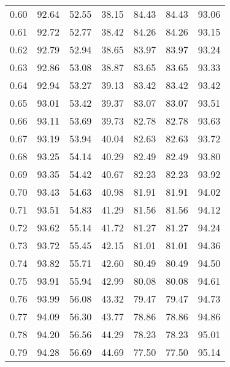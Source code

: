 \begin{tabular}{|c|c|c|c|c|c|c|}
      0.60 &     92.64 &     52.55 &      38.15 &   84.43 &      84.43 &         93.06 \\
      0.61 &     92.72 &     52.77 &      38.42 &   84.26 &      84.26 &         93.15 \\
      0.62 &     92.79 &     52.94 &      38.65 &   83.97 &      83.97 &         93.24 \\
      0.63 &     92.86 &     53.08 &      38.87 &   83.65 &      83.65 &         93.33 \\
      0.64 &     92.94 &     53.27 &      39.13 &   83.42 &      83.42 &         93.42 \\
      0.65 &     93.01 &     53.42 &      39.37 &   83.07 &      83.07 &         93.51 \\
      0.66 &     93.11 &     53.69 &      39.73 &   82.78 &      82.78 &         93.63 \\
      0.67 &     93.19 &     53.94 &      40.04 &   82.63 &      82.63 &         93.72 \\
      0.68 &     93.25 &     54.14 &      40.29 &   82.49 &      82.49 &         93.80 \\
      0.69 &     93.35 &     54.42 &      40.67 &   82.23 &      82.23 &         93.92 \\
      0.70 &     93.43 &     54.63 &      40.98 &   81.91 &      81.91 &         94.02 \\
      0.71 &     93.51 &     54.83 &      41.29 &   81.56 &      81.56 &         94.12 \\
      0.72 &     93.62 &     55.14 &      41.72 &   81.27 &      81.27 &         94.24 \\
      0.73 &     93.72 &     55.45 &      42.15 &   81.01 &      81.01 &         94.36 \\
      0.74 &     93.82 &     55.71 &      42.60 &   80.49 &      80.49 &         94.50 \\
      0.75 &     93.91 &     55.94 &      42.99 &   80.08 &      80.08 &         94.61 \\
      0.76 &     93.99 &     56.08 &      43.32 &   79.47 &      79.47 &         94.73 \\
      0.77 &     94.09 &     56.30 &      43.77 &   78.86 &      78.86 &         94.86 \\
      0.78 &     94.20 &     56.56 &      44.29 &   78.23 &      78.23 &         95.01 \\
      0.79 &     94.28 &     56.69 &      44.69 &   77.50 &      77.50 &         95.14 \\

\end{tabular}
